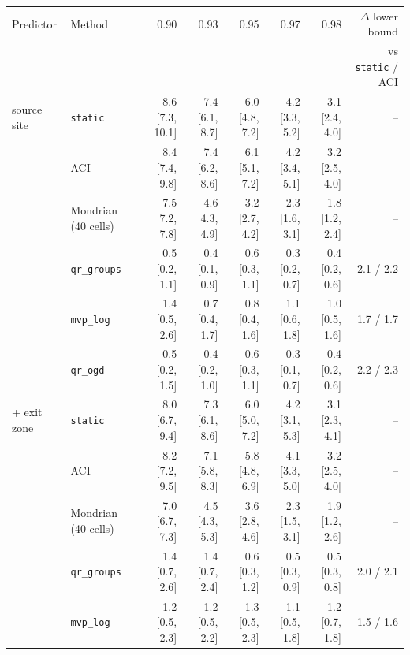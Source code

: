 \setlength{\tabcolsep}{3.0pt}
\begin{tabular}{@{}llrrrrrr@{}}
\toprule
Predictor & Method & 0.90 & 0.93 & 0.95 & 0.97 & 0.98 & $\Delta$ lower bound \\
 & & & & & & & vs \texttt{static} / ACI \\
\midrule
source site & \texttt{static} & 8.6 [7.3, 10.1] & 7.4 [6.1, 8.7] & 6.0 [4.8, 7.2] & 4.2 [3.3, 5.2] & 3.1 [2.4, 4.0] & -- \\
 & ACI & 8.4 [7.4, 9.8] & 7.4 [6.2, 8.6] & 6.1 [5.1, 7.2] & 4.2 [3.4, 5.1] & 3.2 [2.5, 4.0] & -- \\
 & Mondrian (40 cells) & 7.5 [7.2, 7.8] & 4.6 [4.3, 4.9] & 3.2 [2.7, 4.2] & 2.3 [1.6, 3.1] & 1.8 [1.2, 2.4] & -- \\
 & \texttt{qr\_groups} & 0.5 [0.2, 1.1] & 0.4 [0.1, 0.9] & 0.6 [0.3, 1.1] & 0.3 [0.2, 0.7] & 0.4 [0.2, 0.6] & 2.1 / 2.2 \\
 & \texttt{mvp\_log} & 1.4 [0.5, 2.6] & 0.7 [0.4, 1.7] & 0.8 [0.4, 1.6] & 1.1 [0.6, 1.8] & 1.0 [0.5, 1.6] & 1.7 / 1.7 \\
 & \texttt{qr\_ogd} & 0.5 [0.2, 1.5] & 0.4 [0.2, 1.0] & 0.6 [0.3, 1.1] & 0.3 [0.1, 0.7] & 0.4 [0.2, 0.6] & 2.2 / 2.3 \\
\addlinespace
+ exit zone & \texttt{static} & 8.0 [6.7, 9.4] & 7.3 [6.1, 8.6] & 6.0 [5.0, 7.2] & 4.2 [3.1, 5.3] & 3.1 [2.3, 4.1] & -- \\
 & ACI & 8.2 [7.2, 9.5] & 7.1 [5.8, 8.3] & 5.8 [4.8, 6.9] & 4.1 [3.3, 5.0] & 3.2 [2.5, 4.0] & -- \\
 & Mondrian (40 cells) & 7.0 [6.7, 7.3] & 4.5 [4.3, 5.3] & 3.6 [2.8, 4.6] & 2.3 [1.5, 3.1] & 1.9 [1.2, 2.6] & -- \\
 & \texttt{qr\_groups} & 1.4 [0.7, 2.6] & 1.4 [0.7, 2.4] & 0.6 [0.3, 1.2] & 0.5 [0.3, 0.9] & 0.5 [0.3, 0.8] & 2.0 / 2.1 \\
 & \texttt{mvp\_log} & 1.2 [0.5, 2.3] & 1.2 [0.5, 2.2] & 1.3 [0.5, 2.3] & 1.1 [0.5, 1.8] & 1.2 [0.7, 1.8] & 1.5 / 1.6 \\

\end{tabular}
